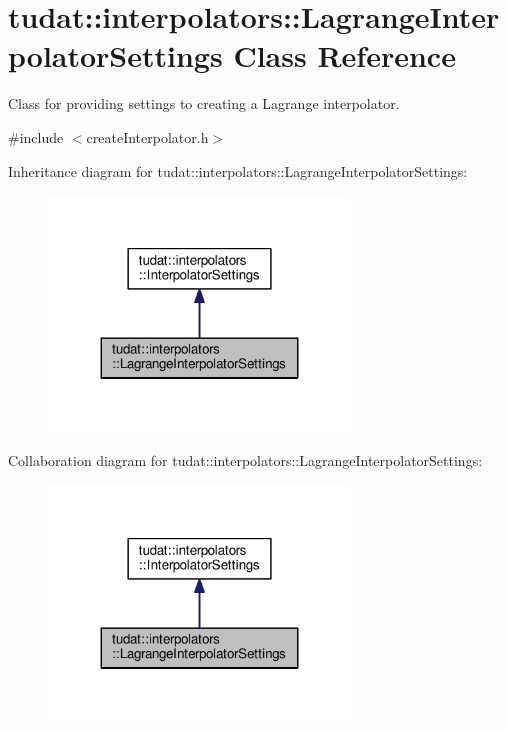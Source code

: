 \hypertarget{classtudat_1_1interpolators_1_1LagrangeInterpolatorSettings}{}\section{tudat\+:\+:interpolators\+:\+:Lagrange\+Interpolator\+Settings Class Reference}
\label{classtudat_1_1interpolators_1_1LagrangeInterpolatorSettings}


Class for providing settings to creating a Lagrange interpolator.  




{\ttfamily \#include $<$create\+Interpolator.\+h$>$}



Inheritance diagram for tudat\+:\+:interpolators\+:\+:Lagrange\+Interpolator\+Settings\+:
\nopagebreak
\begin{figure}[H]
\begin{center}
\leavevmode
\includegraphics[width=227pt]{classtudat_1_1interpolators_1_1LagrangeInterpolatorSettings__inherit__graph}
\end{center}
\end{figure}


Collaboration diagram for tudat\+:\+:interpolators\+:\+:Lagrange\+Interpolator\+Settings\+:
\nopagebreak
\begin{figure}[H]
\begin{center}
\leavevmode
\includegraphics[width=227pt]{classtudat_1_1interpolators_1_1LagrangeInterpolatorSettings__coll__graph}
\end{center}
\end{figure}

